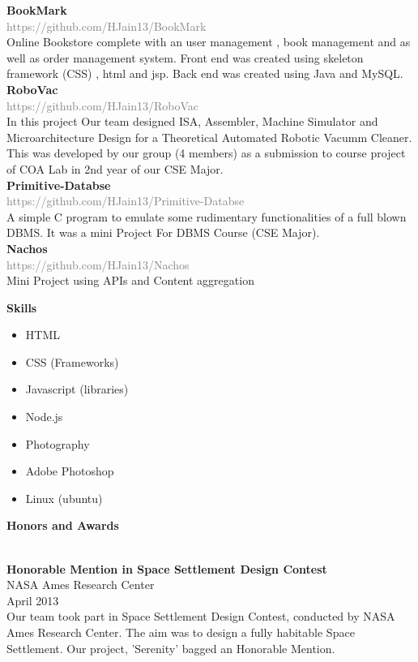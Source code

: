 \documentclass[12pt]{article}
\newcommand{\mybox}[1]{\par\noindent\colorbox{shadecolor}
{\parbox{\dimexpr\textwidth-2\fboxsep\relax}{#1}}}
\begin{document}
\textbf{BookMark}\\
\textcolor{gray}{https://github.com/HJain13/BookMark}\\
Online Bookstore complete with an user management , book management and as well as order management system. Front end was created using skeleton framework (CSS) , html and jsp. Back end was created using Java and MySQL.\\
\textbf{RoboVac}\\
\textcolor{gray}{https://github.com/HJain13/RoboVac}\\
In this project Our team designed ISA, Assembler, Machine Simulator and Microarchitecture Design for a Theoretical Automated Robotic Vacumm Cleaner. This was developed by our group (4 members) as a submission to course project of COA Lab in 2nd year of our CSE Major.\\
\textbf{Primitive-Databse}\\
\textcolor{gray}{https://github.com/HJain13/Primitive-Databse}\\
A simple C program to emulate some rudimentary functionalities of a full blown DBMS. It was a mini Project For DBMS Course (CSE Major).\\
\textbf{Nachos}\\
\textcolor{gray}{https://github.com/HJain13/Nachos}\\
Mini Project using APIs and Content aggregation\\
\hrulefill
\begin{large}
\mybox{\textbf{Skills}}
\end{large}
\begin{itemize}
  \item HTML
  \item CSS (Frameworks)
  \item Javascript (libraries)
  \item Node.js
  \item Photography
  \item Adobe Photoshop
  \item Linux (ubuntu)
\end{itemize}
\begin{large}
\mybox{\textbf{Honors and Awards}}
\end{large}
\\
\textbf{Honorable Mention in Space Settlement Design Contest}\\
NASA Ames Research Center\\
April 2013\\
Our team took part in Space Settlement Design Contest, conducted by NASA Ames Research Center. The aim was to design a fully habitable Space Settlement. Our project, 'Serenity'  bagged an Honorable Mention.\\
\hrulefill
\end{document}
